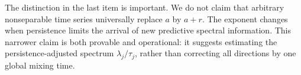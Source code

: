 The distinction in the last item is important.  We do not claim that arbitrary
nonseparable time series universally replace $a$ by $a+r$.  The exponent
changes when persistence limits the arrival of new predictive spectral
information.  This narrower claim is both provable and operational: it suggests
estimating the persistence-adjusted spectrum $\lambda_j/\tau_j$, rather than
correcting all directions by one global mixing time.
